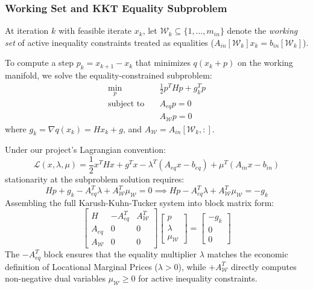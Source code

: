 \subsubsection{Working Set and KKT Equality Subproblem}
At iteration $k$ with feasible iterate $x_k$, let $\mathcal{W}_k \subseteq \{1, \dots, m_{in}\}$ denote the \textit{working set} of active inequality constraints treated as equalities ($A_{in}[\mathcal{W}_k] x_k = b_{in}[\mathcal{W}_k]$).

To compute a step $p_k = x_{k+1} - x_k$ that minimizes $q(x_k + p)$ on the working manifold, we solve the equality-constrained subproblem:
\begin{align}
    \min_{p} \quad & \frac{1}{2} p^T H p + g_k^T p \\
    \text{subject to} \quad & A_{eq} p = 0 \\
    & A_{\mathcal{W}} p = 0
\end{align}
where $g_k = \nabla q(x_k) = H x_k + g$, and $A_{\mathcal{W}} = A_{in}[\mathcal{W}_k, :]$.

Under our project's Lagrangian convention:
\begin{equation}
    \mathcal{L}(x, \lambda, \mu) = \frac{1}{2} x^T H x + g^T x - \lambda^T (A_{eq} x - b_{eq}) + \mu^T (A_{in} x - b_{in})
\end{equation}
stationarity at the subproblem solution requires:
\begin{equation}
    H p + g_k - A_{eq}^T \lambda + A_{\mathcal{W}}^T \mu_{\mathcal{W}} = 0 \implies H p - A_{eq}^T \lambda + A_{\mathcal{W}}^T \mu_{\mathcal{W}} = -g_k
\end{equation}
Assembling the full Karush-Kuhn-Tucker system into block matrix form:
\begin{equation}
    \begin{bmatrix}
        H & -A_{eq}^T & A_{\mathcal{W}}^T \\
        A_{eq} & 0 & 0 \\
        A_{\mathcal{W}} & 0 & 0
    \end{bmatrix}
    \begin{bmatrix}
        p \\
        \lambda \\
        \mu_{\mathcal{W}}
    \end{bmatrix}
    =
    \begin{bmatrix}
        -g_k \\
        0 \\
        0
    \end{bmatrix}
    \label{eq:kkt_system}
\end{equation}
The $-A_{eq}^T$ block ensures that the equality multiplier $\lambda$ matches the economic definition of Locational Marginal Prices ($\lambda > 0$), while $+A_{\mathcal{W}}^T$ directly computes non-negative dual variables $\mu_{\mathcal{W}} \ge 0$ for active inequality constraints.

